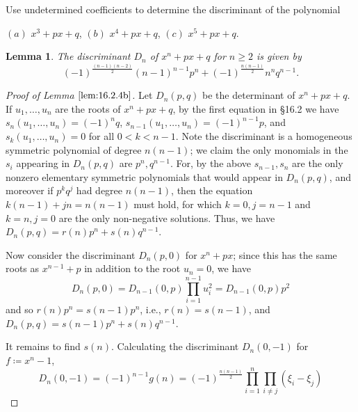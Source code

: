 \documentclass[12pt]{article}
\newtheorem{lemma}{Lemma}[subsubsection]
\theoremstyle{remark}
\begin{document}
\setcounter{subsubsection}{3}
\begin{problem}\label{exc:16.2.4}
  Use undetermined coefficients to determine the discriminant of the polynomial
  \par \noindent $(a)$ $x^3 + px + q$, $(b)$ $x^4+px+q$, $(c)$ $x^5+px+q$.
\end{problem}
\begin{lemma}\label{lem:16.2.4b}
  The discriminant $D_n$ of $x^n + px + q$ for $n\ge2$ is given by
  \begin{equation*}
     (-1)^{\frac{(n-1)(n-2)}{2}}(n-1)^{n-1}p^n + (-1)^{\frac{n(n-1)}{2}}n^nq^{n-1}.
  \end{equation*}
\end{lemma}
\begin{proof}[Proof of Lemma $\ref{lem:16.2.4b}$]
  Let $D_n(p,q)$ be the determinant of $x^n + px + q$. If $u_1,\ldots,u_n$ are the roots of $x^n + px + q$, by the first equation in \S16.2
  we have $s_n(u_1,\ldots,u_n) = (-1)^nq$, $s_{n-1}(u_1,\ldots,u_n) = (-1)^{n-1}p$, and $s_k(u_1,\ldots,u_n) = 0$ for all $0 < k < n-1$. Note the discriminant is a homogeneous symmetric polynomial of degree $n(n-1)$; we claim the only monomials in the $s_i$ appearing in $D_n(p,q)$ are $p^n,q^{n-1}$. For, by the above $s_{n-1},s_n$ are the only nonzero elementary symmetric polynomials that would appear in $D_n(p,q)$, and moreover if $p^kq^j$ had degree $n(n-1)$, then the equation $k(n-1)+jn = n(n-1)$ must hold, for which $k=0,j=n-1$ and $k=n,j=0$ are the only non-negative solutions. Thus, we have $D_n(p,q) = r(n)p^n + s(n)q^{n-1}$.
  \par Now consider the discriminant $D_n(p,0)$ for $x^n + px$; since this has the same roots as $x^{n-1} + p$ in addition to the root $u_n=0$, we have
  \begin{equation*}
    D_n(p,0) = D_{n-1}(0,p)\prod_{i=1}^{n-1} u_i^2 = D_{n-1}(0,p)p^2
  \end{equation*}
  and so $r(n)p^n = s(n-1)p^n$, i.e., $r(n) = s(n-1)$, and $D_n(p,q) = s(n-1)p^n + s(n)q^{n-1}$.
  \par It remains to find $s(n)$. Calculating the discriminant $D_n(0,-1)$ for $f \coloneqq x^n-1$,
  \begin{equation*}
    D_n(0,-1) = (-1)^{n-1}g(n) = (-1)^{\frac{n(n-1)}{2}}\prod_{i=1}^n\prod_{i \ne j} (\xi_i-\xi_j) 
  \end{equation*}

\end{proof}
\end{document}
